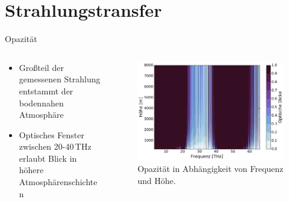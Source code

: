 \documentclass{beamer}
\begin{document}
\section{Strah\-lungs\-trans\-fer}
\begin{frame}{Opazität}
\begin{columns}
\begin{column}{0.45\textwidth}
\begin{itemize}
  \vfill\item Großteil der gemessenen Strahlung entstammt der bodennahen Atmosphäre
  \vfill\item Optisches Fenster zwischen 20-40\,THz erlaubt Blick in höhere
      Atmosphärenschichten
  \vfill
\end{itemize}
\end{column}

\begin{column}{0.55\textwidth}
\begin{figure}[ht]
    \centering
    \includegraphics[width=1\textwidth]{figures/midlatitude-summer_window.pdf}
    \caption{Opazität in Abhängigkeit von Frequenz und Höhe.}
    \label{fig:window}
\end{figure}
\end{column}
\end{columns}
\end{frame}
\end{document}
